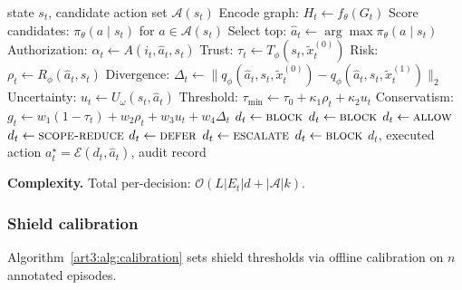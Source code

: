 \begin{algorithm}[t]
\caption{CASTER-ZT bounded autonomous recovery decision}
\label{art3:alg:casterzt}
\begin{algorithmic}[1]
\Require state $s_t$, candidate action set $\mathcal{A}(s_t)$
\State Encode graph: $H_t \gets f_\theta(G_t)$
\State Score candidates: $\pi_\theta(a \mid s_t)$ for $a \in \mathcal{A}(s_t)$
\State Select top: $\hat a_t \gets \arg\max \pi_\theta(a \mid s_t)$
\State Authorization: $\alpha_t \gets A(i_t,\hat a_t,s_t)$
\State Trust: $\tau_t \gets T_\phi(s_t, \tilde{x}_t^{(0)})$
\State Risk: $\rho_t \gets R_\phi(\hat a_t, s_t)$
\State Divergence: $\Delta_t \gets \| q_\phi(\hat a_t,s_t,\tilde{x}_t^{(0)}) - q_\phi(\hat a_t,s_t,\tilde{x}_t^{(1)}) \|_2$
\State Uncertainty: $u_t \gets U_\omega(s_t,\hat a_t)$
\State Threshold: $\tau_{\min} \gets \tau_0 + \kappa_1\rho_t + \kappa_2 u_t$
\State Conservatism: $g_t \gets w_1(1-\tau_t)+w_2\rho_t+w_3 u_t+w_4\Delta_t$
    \State $d_t \gets \textsc{block}$
    \State $d_t \gets \textsc{block}$
    \State $d_t \gets \textsc{allow}$
    \State $d_t \gets \textsc{scope-reduce}$
    \State $d_t \gets \textsc{defer}$
    \State $d_t \gets \textsc{escalate}$
\Else
    \State $d_t \gets \textsc{block}$
\EndIf
\State \Return $d_t$, executed action $a_t^\star = \mathcal{E}(d_t,\hat a_t)$, audit record
\end{algorithmic}
\end{algorithm}

\noindent\textbf{Complexity.}
Total per-decision: $\mathcal{O}(L|E_t|d + |\mathcal{A}|k)$.

\subsubsection{Shield calibration}

Algorithm~\ref{art3:alg:calibration} sets shield thresholds via offline calibration on $n$ annotated episodes.

